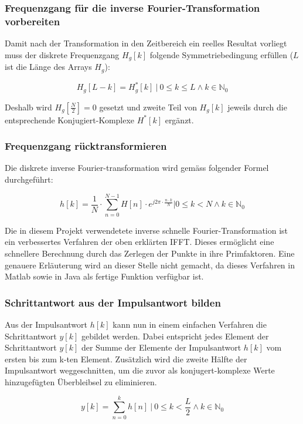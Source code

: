 \subsubsection*{Frequenzgang f\"ur die inverse Fourier-Transformation vorbereiten}
Damit nach der Transformation in den Zeitbereich ein reelles Resultat vorliegt
muss der diskrete Frequenzgang $H_g[k]$ folgende Symmetriebedingung erf\"ullen
($L$ ist die L\"ange des Arrays $H_g$):

\begin{equation*}
    H_g[L-k]=H_g^*[k]  ~|~ 0 \leq k \leq L \land k \in \mathbb{N}_0
\end{equation*}

Deshalb  wird $H_g[\frac{N}{2}]  = 0$  gesetzt  und zweite  Teil von  $H_g[k]$
jeweils durch die entsprechende Konjugiert-Komplexe $H^*[k]$ erg\"anzt.

\subsubsection*{Frequenzgang r\"ucktransformieren}
Die  diskrete inverse  Fourier-transformation wird  gem\"ass folgender  Formel
durchgef\"uhrt:

\begin{equation*}
    h[k]  = \frac{1}{N}  \cdot \displaystyle\sum_{n=0}^{N-1}  H[n] \cdot
    e^{j 2\pi \cdot \frac{n \cdot k}{N}} | 0 \leq k < N \land k \in \mathbb{N}_0
\end{equation*}

Die in diesem Projekt verwendetete inverse schnelle Fourier-Transformation ist
ein  verbessertes Verfahren  der oben  erkl\"arten IFFT.   Dieses erm\"oglicht
eine   schnellere  Berechnung   durch  das   Zerlegen  der   Punkte  in   ihre
Primfaktoren. Eine genauere Erl\"auterung wird an dieser Stelle nicht gemacht,
da dieses Verfahren  in Matlab sowie in Java als  fertige Funktion verf\"ugbar
ist.


\subsubsection*{Schrittantwort aus der Impulsantwort bilden}
Aus  der  Impulsantwort $h[k]$  kann  nun  in  einem einfachen  Verfahren  die
Schrittantwort  $y[k]$ gebildet  werden.  Dabei  entspricht jedes  Element der
Schrittantwort  $y[k]$ der  Summe der  Elemente der  Impulsantwort $h[k]$  vom
ersten  bis zum  k-ten Element.   Zus\"atzlich  wird die  zweite H\"alfte  der
Impulsantwort  weggeschnitten,  um  die  zuvor  als  konjugert-komplexe  Werte
hinzugef\"ugten \"Uberbleibsel zu eliminieren.

\begin{equation*}
    y[k]= \sum_{n=0}^k h[n] ~|~ 0 \leq k < \frac{L}{2} \land k \in \mathbb{N}_0
\end{equation*}
